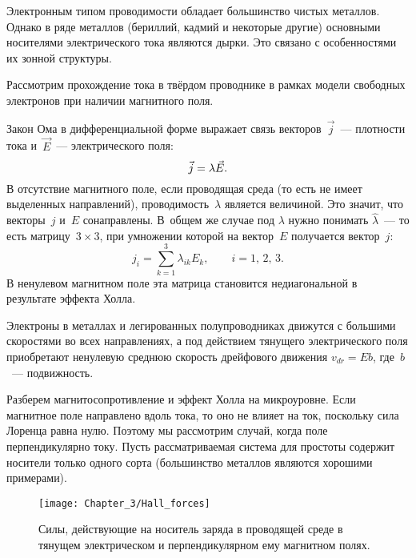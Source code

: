 Электронным типом проводимости обладает большинство чистых металлов. Однако в
ряде металлов (бериллий, кадмий и некоторые другие) основными носителями
электрического тока являются дырки. Это связано с особенностями их зонной
структуры.
\todo[inline]{<---}



Рассмотрим прохождение тока в твёрдом проводнике в рамках модели
свободных электронов при наличии магнитного поля.

Закон Ома в дифференциальной форме выражает связь векторов~$\vec{j}$~---
плотности тока и~$\vec{E}$~--- электрического поля:
\begin{equation}
    \vec{j}=\lambda \vec{E}.
	\eqmark{3.16}
\end{equation}
В отсутствие магнитного поле, если проводящая среда 
(то есть не имеет выделенных направлений), проводимость~$\lambda$ является
 величиной. Это значит, что векторы~$j$ и~$E$ сонаправлены.
В~общем же случае под $\lambda$ нужно понимать  $\widehat{\lambda}$~--- то есть
матрицу~$3\times 3$, при умножении которой на вектор~$E$ получается вектор~$j$:
\begin{equation*}
    j_{i} = \sum_{k=1}^3 \lambda_{ik} E_k,\qquad i=1,\,2,\,3.
\end{equation*}
В ненулевом магнитном поле эта матрица становится недиагональной в результате
эффекта Холла.

Электроны в металлах и легированных полупроводниках движутся с большими
скоростями во всех направлениях, а под действием тянущего
электрического поля приобретают ненулевую среднюю скорость дрейфового движения
$v_{dr}=  Eb$, где~$b$~--- подвижность.

Разберем магнитосопротивление и эффект Холла на микроуровне. Если магнитное поле
направлено вдоль тока, то
оно не влияет на ток, поскольку сила Лоренца равна нулю. Поэтому мы рассмотрим
случай, когда поле перпендикулярно
току. Пусть рассматриваемая система для простоты содержит носители только одного
сорта (большинство металлов являются хорошими примерами).
\begin{figure}[h!]
	\texttt{[image: Chapter\_3/Hall\_forces]}
	\caption{Силы, действующие на носитель заряда в проводящей среде в тянущем
электрическом и перпендикулярном ему магнитном полях.}
\end{figure}

